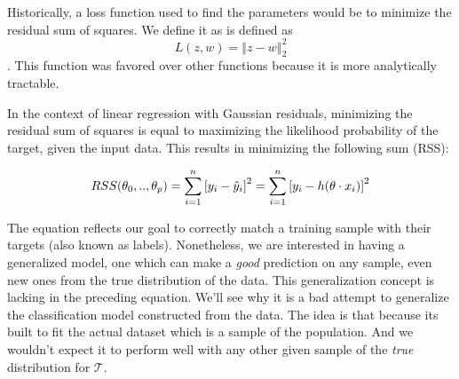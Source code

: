 Historically, a loss function used to find the parameters would be to minimize the residual sum of squares.
We define it as is defined as $$L(z,w) = \left\Vert z-w \right\Vert^2_2$$.
This function was favored over other functions because it is more analytically tractable.

In the context of linear regression with Gaussian residuals, minimizing the residual sum of squares is equal to maximizing the likelihood probability of the target, given the input data. This results in minimizing the following sum (RSS):

\begin{equation}\label{eq:rss}
RSS(\theta_0,..,\theta_p) = \sum_{i=1}^n {[y_i - \hat{y}_i ] }^2 \\
= \sum_{i=1}^n  {[y_i - h( \theta \cdot x_i)] }^2
\end{equation}

The equation reflects our goal to correctly match a training sample with their targets (also known as labels). Nonetheless, we are interested in having a generalized model, one which can make a \textit{good} prediction on any sample, even new ones from the true distribution of the data.
This generalization concept is lacking in the preceding equation. We'll see why it is a bad attempt to generalize the classification model constructed from the data. The idea is that because its built to fit the actual dataset which is a sample of the population. And we wouldn't expect it to perform well with any other given sample of the \textit{true} distribution for $\mathcal{T}$.
